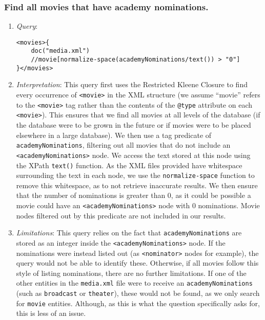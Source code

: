 \documentclass[11pt]{article}
\begin{document}
\subsubsection{Find all movies that have academy nominations.}

\begin{enumerate}
\item \textit{Query}:
\begin{small}
\begin{verbatim}
<movies>{
    doc("media.xml")
    //movie[normalize-space(academyNominations/text()) > "0"]
}</movies>
\end{verbatim}
\end{small}
\item \textit{Interpretation}: This query first uses the Restricted Kleene Closure to find every occurrence of \texttt{<movie>} in the XML structure (we assume ``movie'' refers to the \texttt{<movie>} tag rather than the contents of the \texttt{@type} attribute on each \texttt{<movie>}). This ensures that we find all movies at all levels of the database (if the database were to be grown in the future or if movies were to be placed elsewhere in a large database). We then use a tag predicate of \texttt{academyNominations}, filtering out all movies that do not include an \texttt{<academyNominations>} node. We access the text stored at this node using the XPath \texttt{text()} function. As the XML files provided have whitespace surrounding the text in each node, we use the \texttt{normalize-space} function to remove this whitespace, as to not retrieve inaccurate results. We then ensure that the number of nominations is greater than 0, as it could be possible a movie could have an \texttt{<academyNominations>} node with 0 nominations. Movie nodes filtered out by this predicate are not included in our results.

\item \textit{Limitations}: This query relies on the fact that \texttt{academyNominations} are stored as an integer inside the \texttt{<academyNominations>} node. If the nominations were instead listed out (as \texttt{<nominator>} nodes for example), the query would not be able to identify these. Otherwise, if all movies follow this style of listing nominations, there are no further limitations. If one of the other entities in the \texttt{media.xml} file were to receive an \texttt{academyNominations} (such as \texttt{broadcast} or \texttt{theater}), these would not be found, as we only search for \texttt{movie} entities. Although, as this is what the question specifically asks for, this is less of an issue. 


\end{enumerate}
\end{document}
